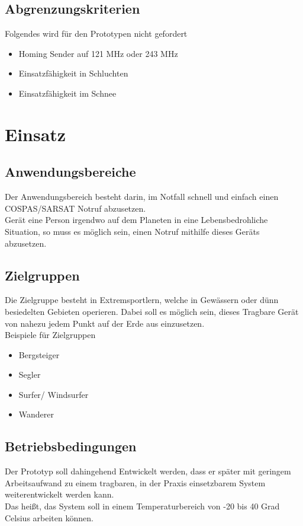 \documentclass[a4paper]{scrreprt}
\begin{document}
\section{Abgrenzungskriterien}
Folgendes wird für den Prototypen nicht gefordert
\begin{itemize}
	\item Homing Sender auf 121 MHz oder 243 MHz
	\item Einsatzfähigkeit in Schluchten
	\item Einsatzfähigkeit im Schnee
\end{itemize}
 
\chapter{Einsatz}

 
\section{Anwendungsbereiche}
Der Anwendungsbereich besteht darin, im Notfall schnell und einfach einen COSPAS/SARSAT Notruf abzusetzen. \\
Gerät eine Person irgendwo auf dem Planeten in eine Lebensbedrohliche Situation, so muss es möglich sein, einen Notruf mithilfe dieses Geräts abzusetzen.
 
\section{Zielgruppen}
Die Zielgruppe besteht in Extremsportlern, welche in Gewässern oder dünn besiedelten Gebieten operieren. Dabei soll es möglich sein, dieses Tragbare Gerät von nahezu jedem Punkt auf der Erde aus einzusetzen.
\\
Beispiele für Zielgruppen
\begin{itemize}
	\item Bergsteiger
	\item Segler
	\item Surfer/ Windsurfer
	\item Wanderer
\end{itemize}
 
\section{Betriebsbedingungen}
Der Prototyp soll dahingehend Entwickelt werden, dass er später mit geringem Arbeitsaufwand zu einem tragbaren, in der Praxis einsetzbarem System weiterentwickelt werden kann.\\Das heißt, das System soll in einem Temperaturbereich von -20 bis 40 Grad Celsius arbeiten können.
 
\end{document}
